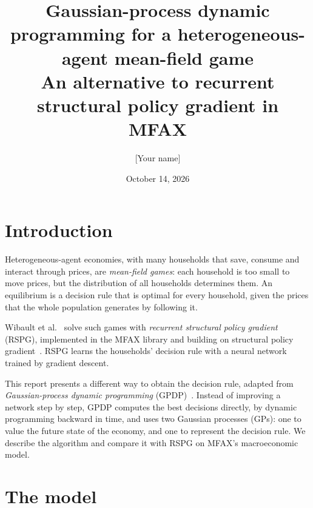 \documentclass[11pt,a4paper]{article}
\title{Gaussian-process dynamic programming for a heterogeneous-agent mean-field game\\
\large An alternative to recurrent structural policy gradient in MFAX}
\author{[Your name]}
\date{October 14, 2026}
\begin{document}
\maketitle

\section{Introduction}

Heterogeneous-agent economies, with many households that save, consume and interact through prices,
are \emph{mean-field games}: each household is too small to move prices, but the distribution of all
households determines them. An equilibrium is a decision rule that is optimal for every household,
given the prices that the whole population generates by following it.

Wibault et al.~\cite{rspg} solve such games with \emph{recurrent structural policy gradient} (RSPG),
implemented in the MFAX library and building on structural policy gradient~\cite{spg}. RSPG learns
the households' decision rule with a neural network trained by gradient descent.

This report presents a different way to obtain the decision rule, adapted from
\emph{Gaussian-process dynamic programming} (GPDP)~\cite{deisenroth}. Instead of improving a network
step by step, GPDP computes the best decisions directly, by dynamic programming backward in time,
and uses two Gaussian processes (GPs): one to value the future state of the economy, and one to
represent the decision rule. We describe the algorithm and compare it with RSPG on MFAX's
macroeconomic model.

\section{The model}\label{sec:model}
\end{document}
